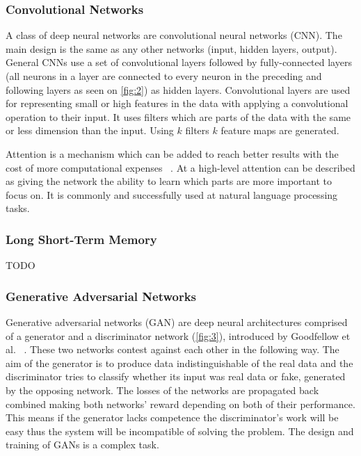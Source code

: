 \documentclass[11pt,a4paper,oneside]{article}
\begin{document}
  \subsubsection{Convolutional Networks}
  \label{sec:conv_nets}

  A class of deep neural networks are convolutional neural networks (CNN). The main design is the same as any other 
  networks (input, hidden layers, output). General CNNs use a set of convolutional layers followed by fully-connected 
  layers (all neurons in a layer are connected to every neuron in the preceding and following layers as seen on 
  \autoref{fig:2}) as hidden layers. Convolutional layers are used for representing small or high features in the data 
  with applying a convolutional operation to their input. It uses filters which are parts of the data with the same or 
  less dimension than the input. Using $k$ filters $k$ feature maps are generated.
  
  Attention is a mechanism which can be added to reach better results with the cost of more computational expenses 
  ~\cite{attention}. At a high-level attention can be described as giving the network the ability to learn which parts 
  are more important to focus on. It is commonly and successfully used at natural language processing tasks.

  \subsubsection{Long Short-Term Memory}
  \label{sec:lstm}

  TODO

  \subsubsection{Generative Adversarial Networks}
  \label{sec:gans}

  Generative adversarial networks (GAN) are deep neural architectures comprised of a generator and a discriminator 
  network (\autoref{fig:3}), introduced by Goodfellow et al. ~\cite{gan}. These two networks contest against each other 
  in the following way. The aim of the generator is to produce data indistinguishable of the real data and the 
  discriminator tries to classify whether its input was real data or fake, generated by the opposing network. The losses 
  of the networks are propagated back combined making both networks’ reward depending on both of their performance. This 
  means if the generator lacks competence the discriminator’s work will be easy thus the system will be incompatible of 
  solving the problem. The design and training of GANs is a complex task.
\end{document}
